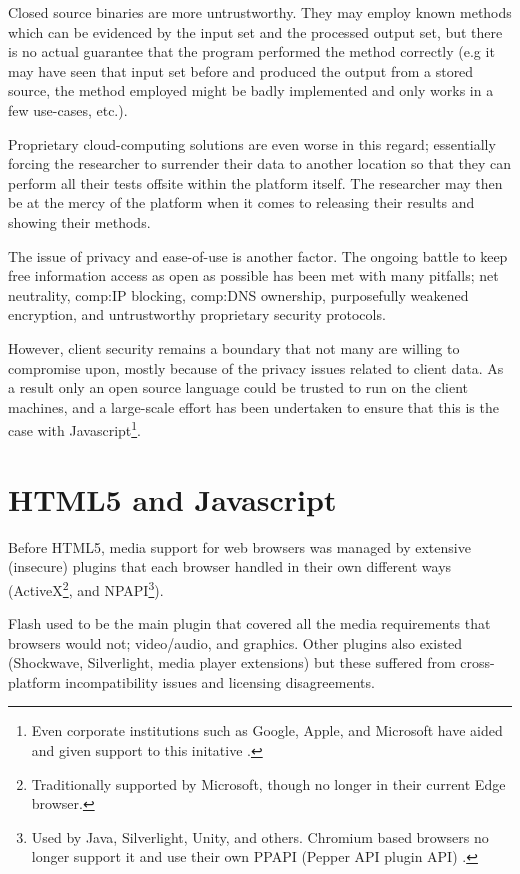 Closed source binaries are more untrustworthy. They may employ known methods which can be evidenced by the input set and the processed output set, but there is no actual guarantee that the program performed the method correctly (e.g it may have seen that input set before and produced the output from a stored source, the method employed might be badly implemented and only works in a few use-cases, etc.).

Proprietary cloud-computing solutions are even worse in this regard; essentially forcing the researcher to surrender their data to another location so that they can perform all their tests offsite within the platform itself. The researcher may then be at the mercy of the platform when it comes to releasing their results and showing their methods.

The issue of privacy and ease-of-use is another factor. The ongoing battle to keep free information access as open as possible has been met with many pitfalls; net neutrality, \gls{comp:IP} blocking, \gls{comp:DNS} ownership, purposefully weakened encryption, and untrustworthy proprietary security protocols. 

However, client security remains a boundary that not many are willing to compromise upon, mostly because of the privacy issues related to client data. As a result only an open source language could be trusted to run on the client machines, and a large-scale effort has been undertaken to ensure that this is the case with Javascript\footnote{Even corporate institutions such as Google, Apple, and Microsoft have aided and given support to this initative \cite{o2004open}.}.


\section{HTML5 and Javascript}

Before HTML5, media support for web browsers was managed by extensive (insecure) plugins that each browser handled in their own different ways (ActiveX\footnote{Traditionally supported by Microsoft, though no longer in their current Edge browser.}, and NPAPI\footnote{Used by Java, Silverlight, Unity, and others. Chromium based browsers no longer support it and use their own PPAPI (Pepper API plugin API) \cite{eriksson2012migrating}.}).

Flash used to be the main plugin that covered all the media requirements that browsers would not; video/audio, and graphics. Other plugins also existed (Shockwave, Silverlight, media player extensions) but these suffered from cross-platform incompatibility issues and licensing disagreements.

